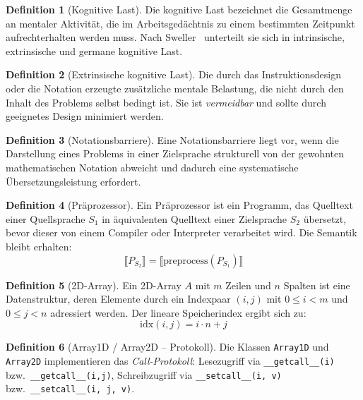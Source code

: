 \documentclass[a4paper,12pt]{article}
\theoremstyle{definition}
\newtheorem{definition}{Definition}
\begin{document}
\begin{definition}[Kognitive Last]
	Die kognitive Last bezeichnet die Gesamtmenge an mentaler Aktivit\"at, die im
	Arbeitsged\"achtnis zu einem bestimmten Zeitpunkt aufrechterhalten werden muss.
	Nach Sweller~\cite{sweller1988} unterteilt sie sich in intrinsische, extrinsische
	und germane kognitive Last.
\end{definition}

\begin{definition}[Extrinsische kognitive Last]
	Die durch das Instruktionsdesign oder die Notation erzeugte zus\"atzliche mentale
	Belastung, die nicht durch den Inhalt des Problems selbst bedingt ist. Sie ist
	\emph{vermeidbar} und sollte durch geeignetes Design minimiert werden.
\end{definition}

\begin{definition}[Notationsbarriere]
	Eine Notationsbarriere liegt vor, wenn die Darstellung eines Problems in einer
	Zielsprache strukturell von der gewohnten mathematischen Notation abweicht und
	dadurch eine systematische \"Ubersetzungsleistung erfordert.
\end{definition}

\begin{definition}[Pr\"aprozessor]
	Ein Pr\"aprozessor ist ein Programm, das Quelltext einer Quellsprache $S_1$ in
	\"aquivalenten Quelltext einer Zielsprache $S_2$ \"ubersetzt, bevor dieser von
	einem Compiler oder Interpreter verarbeitet wird. Die Semantik bleibt erhalten:
	\[
		\llbracket P_{S_2} \rrbracket = \llbracket \text{preprocess}(P_{S_1}) \rrbracket
	\]
\end{definition}

\begin{definition}[2D-Array]
	Ein 2D-Array $A$ mit $m$ Zeilen und $n$ Spalten ist eine Datenstruktur, deren
	Elemente durch ein Indexpaar $(i, j)$ mit $0 \leq i < m$ und $0 \leq j < n$
	adressiert werden. Der lineare Speicherindex ergibt sich zu:
	\[
		\text{idx}(i, j) = i \cdot n + j
	\]
\end{definition}

\begin{definition}[Array1D / Array2D -- Protokoll]
	Die Klassen \texttt{Array1D} und \texttt{Array2D} implementieren das
	\emph{Call-Protokoll}: Lesezugriff via \texttt{\_\_getcall\_\_(i)} bzw.\
	\texttt{\_\_getcall\_\_(i,j)}, Schreibzugriff via \texttt{\_\_setcall\_\_(i, v)}
	bzw.\ \texttt{\_\_setcall\_\_(i, j, v)}.
\end{definition}
\end{document}
